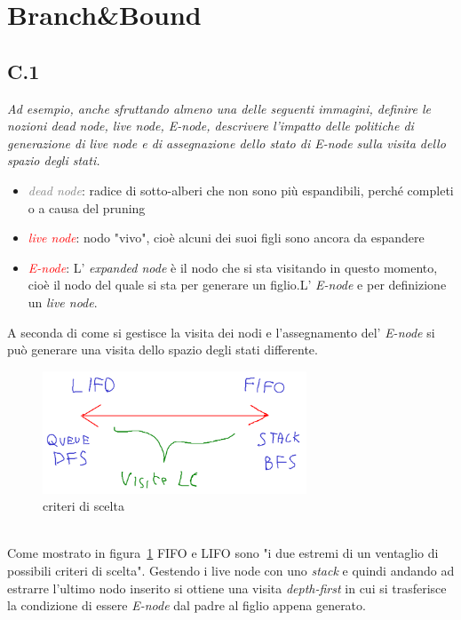 \documentclass[a4paper]{article}
\begin{document}
\section{Branch\&Bound}
\subsection{C.1}
\label{SEC:C_1}
\emph{Ad esempio, anche sfruttando almeno una delle seguenti immagini, definire le nozioni dead node, live node, E-node, descrivere l'impatto delle politiche di generazione di live node e di assegnazione dello stato di E-node sulla visita dello spazio degli stati.}


\begin{itemize}
	\item \textcolor{gray}{\textit{dead node}}: radice di sotto-alberi che non sono più espandibili, perché completi o a causa del pruning
		\item \textcolor{red}{\textit{live node}}: nodo "vivo", cioè alcuni dei suoi figli sono ancora da espandere
		\item \textcolor{red}{\textit{E-node}}: L' \textit{expanded node} è il nodo che si sta visitando in questo momento, cioè il nodo del quale si sta per generare un figlio.L' \textit{E-node} e per definizione un \textit{live node}.
\end{itemize}
A seconda di come si gestisce la visita dei nodi e l'assegnamento del' \textit{E-node} si può generare una visita dello spazio degli stati differente.
\begin{figure}[!ht]
\centering
\includegraphics[width=0.7\textwidth]{./img/C_1.png}
\caption{criteri di scelta} \label{FIG:C_1}
\end{figure}\\
Come mostrato in figura~\ref{FIG:C_1} FIFO e LIFO sono "i due estremi di un ventaglio di possibili criteri di scelta".
Gestendo i live node con uno \emph{stack} e quindi andando ad estrarre l'ultimo nodo inserito si ottiene una visita \textit{depth-first} in cui si trasferisce la condizione di essere \textit{E-node} dal padre al figlio appena generato.
\end{document}

